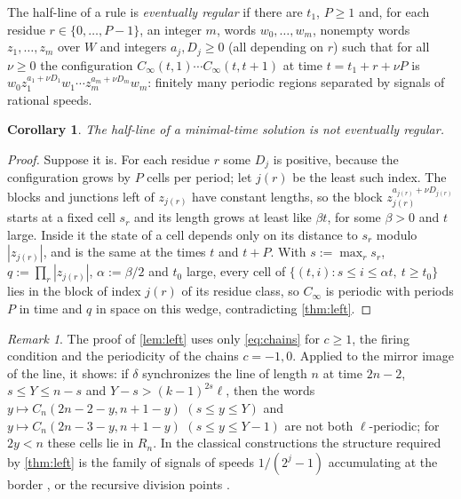 \documentclass[3p]{elsarticle}
\newtheorem{corollary}[theorem]{Corollary}
\theoremstyle{remark}
\newtheorem{remark}[theorem]{Remark}
\begin{document}
The half-line of a rule is \emph{eventually regular} if there are $t_1$,
$P\ge1$ and, for each residue $r\in\{0,\dots,P-1\}$, an integer $m$, words
$w_0,\dots,w_m$, nonempty words $z_1,\dots,z_m$ over $W$ and integers
$a_j,D_j\ge0$ (all depending on $r$) such that for all $\nu\ge0$ the
configuration $C_\infty(t,1)\cdots C_\infty(t,t+1)$ at time $t=t_1+r+\nu P$ is
$w_0z_1^{a_1+\nu D_1}w_1\cdots z_m^{a_m+\nu D_m}w_m$: finitely many periodic
regions separated by signals of rational speeds.

\begin{corollary}\label{cor:regular}
The half-line of a minimal-time solution is not eventually regular.
\end{corollary}

\begin{proof}
Suppose it is. For each residue $r$ some $D_j$ is positive, because the
configuration grows by $P$ cells per period; let $j(r)$ be the least such
index. The blocks and junctions left of $z_{j(r)}$ have constant lengths, so
the block $z_{j(r)}^{a_{j(r)}+\nu D_{j(r)}}$ starts at a fixed cell $s_r$ and its
length grows at least like $\beta t$, for some $\beta>0$ and $t$ large. Inside
it the state of a cell depends only on its distance to $s_r$ modulo
$|z_{j(r)}|$, and is the same at the times $t$ and $t+P$. With
$s:=\max_r s_r$, $q:=\prod_r|z_{j(r)}|$, $\alpha:=\beta/2$ and $t_0$ large, every
cell of $\{(t,i):s\le i\le\alpha t,\ t\ge t_0\}$ lies in the block of index
$j(r)$ of its residue class, so $C_\infty$ is periodic with periods $P$ in time
and $q$ in space on this wedge, contradicting \cref{thm:left}.
\end{proof}

\begin{remark}\label{rem:left}
The proof of \cref{lem:left} uses only \eqref{eq:chains} for $c\ge1$, the
firing condition and the periodicity of the chains $c=-1,0$. Applied to the
mirror image of the line, it shows: if $\delta$ synchronizes the line of length
$n$ at time $2n-2$, $s\le Y\le n-s$ and $Y-s>(k-1)^{2s}\ell$, then the words
$y\mapsto C_n(2n-2-y,n+1-y)$ $(s\le y\le Y)$ and $y\mapsto C_n(2n-3-y,n+1-y)$
$(s\le y\le Y-1)$ are not both $\ell$-periodic; for $2y<n$ these cells lie in
$R_n$. In the classical constructions the structure required by
\cref{thm:left} is the family of signals of speeds $1/(2^j-1)$ accumulating at
the border \cite{Waksman66,Balzer67}, or the recursive division points
\cite{Mazoyer87}.
\end{remark}

\end{document}
